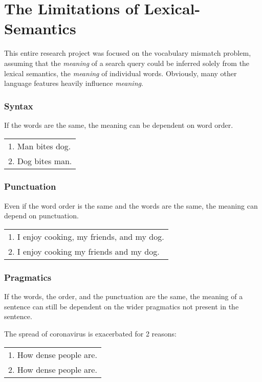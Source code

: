 \section{The Limitations of Lexical-Semantics}

This entire research project was focused on the vocabulary mismatch problem, assuming that the \textit{meaning} of a search query could be inferred solely from the lexical semantics, the \textit{meaning} of individual words. Obviously, many other language features heavily influence \textit{meaning}.

\subsubsection{Syntax}
If the words are the same, the meaning can be dependent on word order.

\begin{center}
    \begin{tabular}{@{}l@{}}
        1. Man bites dog. \\
        2. Dog bites man. \\
    \end{tabular}
\end{center}

\subsubsection{Punctuation}
Even if the word order is the same and the words are the same, the meaning can depend on punctuation.

\begin{center}
    \begin{tabular}{@{}l@{}}
        1. I enjoy cooking, my friends, and my dog. \\
        2. I enjoy cooking my friends and my dog. \\
    \end{tabular}
\end{center}

\subsubsection{Pragmatics}
If the words, the order, and the punctuation are the same, the meaning of a sentence can still be dependent on the wider pragmatics not present in the sentence.

\begin{center}
    The spread of coronavirus is exacerbated for 2 reasons:
\end{center}
\begin{center}
    \begin{tabular}{@{}l@{}}
        1. How dense people are. \\
        2. How dense people are. \\
    \end{tabular}
\end{center}

